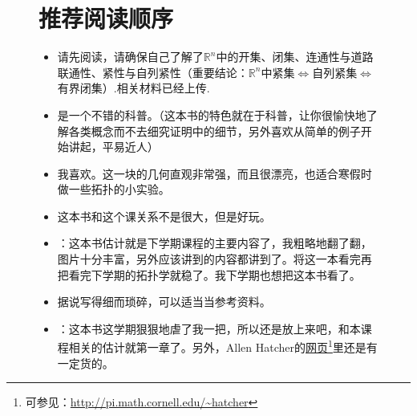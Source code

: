 \documentclass[11pt,A4paper,oneside]{amsart}
\numberwithin{equation}{section}
\theoremstyle{plain}
\theoremstyle{plain}
\numberwithin{equation}{section}
\theoremstyle{remark}
\begin{document}
\begin{figure}[!h]
	\section{推荐阅读顺序}
	\begin{minipage}[b]{.70\textwidth}
		\begin{itemize}
			\item 请先阅读\cite[Chapter 8]{CS12}，请确保自己了解了$\mathbb{R}^n$中的开集、闭集、连通性与道路联通性、紧性与自列紧性（重要结论：$\mathbb{R}^n$中紧集$\Leftrightarrow$自列紧集$\Leftrightarrow$有界闭集）.相关材料已经上传.
			\item \cite[Section 2,4,5 \& Chapter VI]{EC18}是一个不错的科普。（这本书的特色就在于科普，让你很愉快地了解各类概念而不去细究证明中的细节，另外喜欢从简单的例子开始讲起，平易近人）
			\item 我喜欢\cite[p73-79, p82-84, p87-102]{YCY97}。这一块的几何直观非常强，而且很漂亮，也适合寒假时做一些拓扑的小实验。
			\item \cite{ZZM99}这本书和这个课关系不是很大，但是好玩。
			\item \cite{MAA97}：这本书估计就是下学期课程的主要内容了，我粗略地翻了翻，图片十分丰富，另外应该讲到的内容都讲到了。将这一本看完再把\cite[Appendix A]{JM08}看完下学期的拓扑学就稳了。我下学期也想把这本书看了。
			\item 据说\cite{JM00}写得细而琐碎，可以适当当参考资料。
			\item \cite{AH03}：这本书这学期狠狠地虐了我一把，所以还是放上来吧，和本课程相关的估计就第一章了。另外，Allen Hatcher的\href{http://pi.math.cornell.edu/~hatcher/}{网页}\footnote{可参见：\url{http://pi.math.cornell.edu/~hatcher}}里还是有一定货的。
		\end{itemize}
	\end{minipage}
	\begin{minipage}[b]{.27\textwidth}
		\centering

\end{minipage}
\end{figure}
\end{document}
